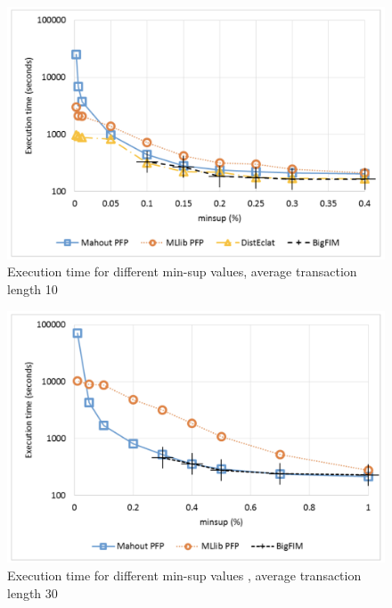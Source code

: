 \begin{figure}[H]
  \centering
  \includegraphics[width=\linewidth]{figures/sparkVsHadoopfig6}
  \caption{Execution time for different min-sup values, average transaction length 10}
  \label{fig:sparkVsHadoopfig6}
\end{figure}

\begin{figure}[H]
  \centering
  \includegraphics[width=\linewidth]{figures/sparkVsHadoopfig7}
  \caption{ Execution time for different min-sup values , average transaction length 30}
  \label{fig:sparkVsHadoopfig7}
\end{figure}

